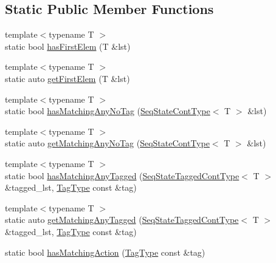 \subsection*{Static Public Member Functions}
\begin{DoxyCompactItemize}
\item 
{\footnotesize template$<$typename T $>$ }\\static bool \hyperlink{structvt_1_1seq_1_1_seq_matcher_virtual_ac21aec817ce2f7a0ff64f39e6a7bce62}{has\+First\+Elem} (T \&lst)
\item 
{\footnotesize template$<$typename T $>$ }\\static auto \hyperlink{structvt_1_1seq_1_1_seq_matcher_virtual_a50a7258f058e464735eeb23de68c4209}{get\+First\+Elem} (T \&lst)
\item 
{\footnotesize template$<$typename T $>$ }\\static bool \hyperlink{structvt_1_1seq_1_1_seq_matcher_virtual_a51876d041e0cd8debc1b1108f6d83bb6}{has\+Matching\+Any\+No\+Tag} (\hyperlink{structvt_1_1seq_1_1_seq_matcher_virtual_a1ce5abe53e93d69d1b487e97fd30fdbd}{Seq\+State\+Cont\+Type}$<$ T $>$ \&lst)
\item 
{\footnotesize template$<$typename T $>$ }\\static auto \hyperlink{structvt_1_1seq_1_1_seq_matcher_virtual_a5c2e339746b1aa156dce23ec95ab806a}{get\+Matching\+Any\+No\+Tag} (\hyperlink{structvt_1_1seq_1_1_seq_matcher_virtual_a1ce5abe53e93d69d1b487e97fd30fdbd}{Seq\+State\+Cont\+Type}$<$ T $>$ \&lst)
\item 
{\footnotesize template$<$typename T $>$ }\\static bool \hyperlink{structvt_1_1seq_1_1_seq_matcher_virtual_a7d2af68d054e9fdbc9f8bb4e34992a49}{has\+Matching\+Any\+Tagged} (\hyperlink{structvt_1_1seq_1_1_seq_matcher_virtual_ab6b75c420d0d3e46e729188d07c11ff2}{Seq\+State\+Tagged\+Cont\+Type}$<$ T $>$ \&tagged\+\_\+lst, \hyperlink{namespacevt_a84ab281dae04a52a4b243d6bf62d0e52}{Tag\+Type} const \&tag)
\item 
{\footnotesize template$<$typename T $>$ }\\static auto \hyperlink{structvt_1_1seq_1_1_seq_matcher_virtual_ad76832cd659402775f98a6ba874d7421}{get\+Matching\+Any\+Tagged} (\hyperlink{structvt_1_1seq_1_1_seq_matcher_virtual_ab6b75c420d0d3e46e729188d07c11ff2}{Seq\+State\+Tagged\+Cont\+Type}$<$ T $>$ \&tagged\+\_\+lst, \hyperlink{namespacevt_a84ab281dae04a52a4b243d6bf62d0e52}{Tag\+Type} const \&tag)
\item 
static bool \hyperlink{structvt_1_1seq_1_1_seq_matcher_virtual_a9edb994600c8caf416f0d2ae1e4d118e}{has\+Matching\+Action} (\hyperlink{namespacevt_a84ab281dae04a52a4b243d6bf62d0e52}{Tag\+Type} const \&tag)

\end{DoxyCompactItemize}
